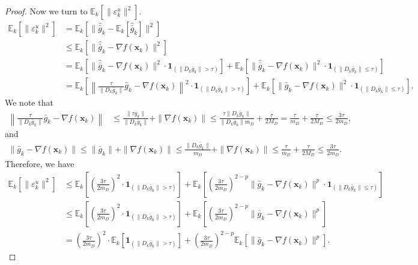 \documentclass{article}
\newcommand{\bx}{\boldsymbol{x}}
\newcommand{\barg}{\bar{g}}
\theoremstyle{plain}
\theoremstyle{definition}
\theoremstyle{remark}
\begin{document}
\begin{proof}
Now we turn to $\mathbb{E}_k[\|\varepsilon_k^u\|^2]$.
\begin{align*}
\mathbb{E}_k[\|\varepsilon_k^u\|^2] & = \mathbb{E}_k[\|\widehat{\barg}_k-\mathbb{E}_k[\widehat{\barg}_k]\|^2] \\
& \leq \mathbb{E}_k[\|\widehat{\barg}_k-\nabla f(\bx_k)\|^2] \\
& = \mathbb{E}_k[\|\widehat{\barg}_k-\nabla f(\bx_k)\|^2\cdot \boldsymbol{1}_{(\|D_k\barg_k\|>\tau)}] + \mathbb{E}_k[\|\widehat{\barg}_k-\nabla f(\bx_k)\|^2\cdot \boldsymbol{1}_{(\|D_k\barg_k\|\leq \tau)}] \\
&  = \mathbb{E}_k\left[\left\|\frac{\tau}{\|D_k\barg_k\|}\barg_k-\nabla f(\bx_k)\right\|^2\cdot \boldsymbol{1}_{(\|D_k\barg_k\|>\tau)}\right] + \mathbb{E}_k[\|\barg_k-\nabla f(\bx_k)\|^2\cdot \boldsymbol{1}_{(\|D_k\barg_k\|\leq \tau)}].
\end{align*}
We note that
\begin{align*}
    \left\|\frac{\tau}{\|D_k\barg_k\|}\barg_k-\nabla f(\bx_k)\right\| & \leq \frac{\|\tau\barg_k\|}{\|D_k\barg_k\|}+\|\nabla f(\bx_k)\| \leq \frac{\tau\|D_k\barg_k\|}{\|D_k\barg_k\|m_D}+\frac{\tau}{2M_D}  = \frac{\tau}{m_D}+\frac{\tau}{2M_D} \leq \frac{3\tau}{2m_D},
\end{align*}
and
\begin{align*}
    \|\barg_k-\nabla f(\bx_k)\|\leq \|\barg_k\|+\|\nabla f(\bx_k)\| \leq \frac{\|D_k\barg_k\|}{m_D} + \|\nabla f(\bx_k)\| \leq \frac{\tau}{m_D} + \frac{\tau}{2M_D} \leq  \frac{3\tau}{2m_D}.
\end{align*}
Therefore, we have
\begin{align*}
\mathbb{E}_k[\|\varepsilon_k^u\|^2] & \leq \mathbb{E}_k\left[\left(\frac{3\tau}{2m_D}\right)^2\cdot \boldsymbol{1}_{(\|D_k\barg_k\|>\tau)}\right] + \mathbb{E}_k\left[\left(\frac{3\tau}{2m_D}\right)^{2-p}\|\barg_k-\nabla f(\bx_k)\|^p\cdot \boldsymbol{1}_{(\|D_k\barg_k\|\leq \tau)}\right]\\
& \leq \mathbb{E}_k\left[\left(\frac{3\tau}{2m_D}\right)^2\cdot \boldsymbol{1}_{(\|D_k\barg_k\|>\tau)}\right] + \mathbb{E}_k\left[\left(\frac{3\tau}{2m_D}\right)^{2-p}\|\barg_k-\nabla f(\bx_k)\|^p\right] \\
& = \left(\frac{3\tau}{2m_D}\right)^2\cdot \mathbb{E}_k[\boldsymbol{1}_{(\|D_k\barg_k\|>\tau)}] + \left(\frac{3\tau}{2m_D}\right)^{2-p} \mathbb{E}_k[\|\barg_k-\nabla f(\bx_k)\|^p] .
\end{align*}



\end{proof}
\end{document}
